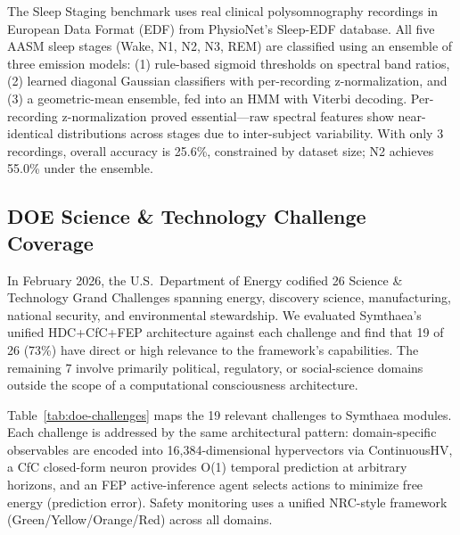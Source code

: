 \documentclass[10pt,letterpaper]{article}
\begin{document}
The Sleep Staging benchmark uses real clinical polysomnography recordings in European Data Format (EDF) from PhysioNet's Sleep-EDF database.
All five AASM sleep stages (Wake, N1, N2, N3, REM) are classified using an ensemble of three emission models: (1) rule-based sigmoid thresholds on spectral band ratios, (2) learned diagonal Gaussian classifiers with per-recording z-normalization, and (3) a geometric-mean ensemble, fed into an HMM with Viterbi decoding.
Per-recording z-normalization proved essential---raw spectral features show near-identical distributions across stages due to inter-subject variability.
With only 3 recordings, overall accuracy is 25.6\%, constrained by dataset size; N2 achieves 55.0\% under the ensemble.

\subsection{DOE Science \& Technology Challenge Coverage}

In February 2026, the U.S.\ Department of Energy codified 26 Science \& Technology Grand Challenges spanning energy, discovery science, manufacturing, national security, and environmental stewardship. We evaluated Symthaea's unified HDC+CfC+FEP architecture against each challenge and find that 19 of 26 (73\%) have direct or high relevance to the framework's capabilities. The remaining 7 involve primarily political, regulatory, or social-science domains outside the scope of a computational consciousness architecture.

Table~\ref{tab:doe-challenges} maps the 19 relevant challenges to Symthaea modules. Each challenge is addressed by the same architectural pattern: domain-specific observables are encoded into 16,384-dimensional hypervectors via ContinuousHV, a CfC closed-form neuron provides O(1) temporal prediction at arbitrary horizons, and an FEP active-inference agent selects actions to minimize free energy (prediction error). Safety monitoring uses a unified NRC-style framework (Green/Yellow/Orange/Red) across all domains.
\end{document}
